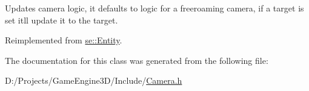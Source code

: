 Updates camera logic, it defaults to logic for a freeroaming camera, if a target is set it\textquotesingle{}ll update it to the target. 

Reimplemented from \mbox{\hyperlink{classse_1_1_entity_a1cd277c4c5a517f5cde8b72d5c40a8f0}{se\+::\+Entity}}.



The documentation for this class was generated from the following file\+:\begin{DoxyCompactItemize}
\item 
D\+:/\+Projects/\+Game\+Engine3\+D/\+Include/\mbox{\hyperlink{_camera_8h}{Camera.\+h}}\end{DoxyCompactItemize}
